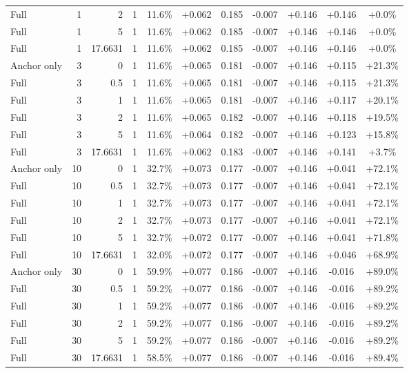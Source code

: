 \begin{table}[htbp]
\begin{tabular}{lrrrccccccc}
Full & 1 & 2 & 1 & 11.6\% & +0.062 & 0.185 & -0.007 & +0.146 & +0.146 & +0.0\% \\
Full & 1 & 5 & 1 & 11.6\% & +0.062 & 0.185 & -0.007 & +0.146 & +0.146 & +0.0\% \\
Full & 1 & 17.6631 & 1 & 11.6\% & +0.062 & 0.185 & -0.007 & +0.146 & +0.146 & +0.0\% \\
Anchor only & 3 & 0 & 1 & 11.6\% & +0.065 & 0.181 & -0.007 & +0.146 & +0.115 & +21.3\% \\
Full & 3 & 0.5 & 1 & 11.6\% & +0.065 & 0.181 & -0.007 & +0.146 & +0.115 & +21.3\% \\
Full & 3 & 1 & 1 & 11.6\% & +0.065 & 0.181 & -0.007 & +0.146 & +0.117 & +20.1\% \\
Full & 3 & 2 & 1 & 11.6\% & +0.065 & 0.182 & -0.007 & +0.146 & +0.118 & +19.5\% \\
Full & 3 & 5 & 1 & 11.6\% & +0.064 & 0.182 & -0.007 & +0.146 & +0.123 & +15.8\% \\
Full & 3 & 17.6631 & 1 & 11.6\% & +0.062 & 0.183 & -0.007 & +0.146 & +0.141 & +3.7\% \\
Anchor only & 10 & 0 & 1 & 32.7\% & +0.073 & 0.177 & -0.007 & +0.146 & +0.041 & +72.1\% \\
Full & 10 & 0.5 & 1 & 32.7\% & +0.073 & 0.177 & -0.007 & +0.146 & +0.041 & +72.1\% \\
Full & 10 & 1 & 1 & 32.7\% & +0.073 & 0.177 & -0.007 & +0.146 & +0.041 & +72.1\% \\
Full & 10 & 2 & 1 & 32.7\% & +0.073 & 0.177 & -0.007 & +0.146 & +0.041 & +72.1\% \\
Full & 10 & 5 & 1 & 32.7\% & +0.072 & 0.177 & -0.007 & +0.146 & +0.041 & +71.8\% \\
Full & 10 & 17.6631 & 1 & 32.0\% & +0.072 & 0.177 & -0.007 & +0.146 & +0.046 & +68.9\% \\
Anchor only & 30 & 0 & 1 & 59.9\% & +0.077 & 0.186 & -0.007 & +0.146 & -0.016 & +89.0\% \\
Full & 30 & 0.5 & 1 & 59.2\% & +0.077 & 0.186 & -0.007 & +0.146 & -0.016 & +89.2\% \\
Full & 30 & 1 & 1 & 59.2\% & +0.077 & 0.186 & -0.007 & +0.146 & -0.016 & +89.2\% \\
Full & 30 & 2 & 1 & 59.2\% & +0.077 & 0.186 & -0.007 & +0.146 & -0.016 & +89.2\% \\
Full & 30 & 5 & 1 & 59.2\% & +0.077 & 0.186 & -0.007 & +0.146 & -0.016 & +89.2\% \\
Full & 30 & 17.6631 & 1 & 58.5\% & +0.077 & 0.186 & -0.007 & +0.146 & -0.016 & +89.4\% \\

\end{tabular}
\end{table}
